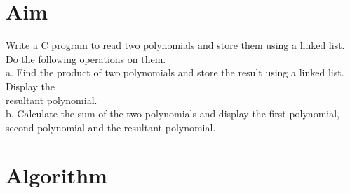 
\section{Aim}
Write a C program to read two polynomials and store them using a linked list. Do the
following operations on them.
\\a. Find the product of two polynomials and store the result using a linked list. Display the
\\resultant polynomial.
\\b. Calculate the sum of the two polynomials and display the first polynomial, second
polynomial and the resultant polynomial.

\section{Algorithm}
